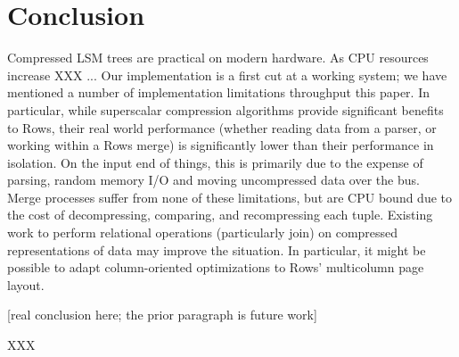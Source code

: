 \documentclass{sig-alternate-sigmod08}
\newcommand{\rows}{Rows\xspace}
\newcommand{\rowss}{Rows'\xspace}
\begin{document}
\section{Conclusion}

Compressed LSM trees are practical on modern hardware.  As CPU
resources increase XXX ... Our implementation is a first cut at a
working system; we have mentioned a number of implementation
limitations throughput this paper.  In particular, while superscalar
compression algorithms provide significant benefits to \rows, their
real world performance (whether reading data from a parser, or working
within a \rows merge) is significantly lower than their performance in
isolation.  On the input end of things, this is primarily due to the
expense of parsing, random memory I/O and moving uncompressed data
over the bus.  Merge processes suffer from none of these limitations,
but are CPU bound due to the cost of decompressing, comparing, and
recompressing each tuple.  Existing work to perform relational
operations (particularly join) on compressed representations of data
may improve the situation.  In particular, it might be possible to
adapt column-oriented optimizations to \rowss multicolumn page layout.

[real conclusion here; the prior paragraph is future work]


XXX\cite{bowman:reasoning}


%
%
\balancecolumns %
\end{document}
